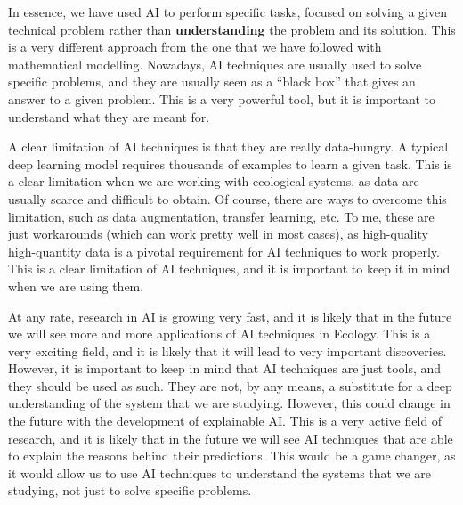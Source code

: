 In
essence, we have used AI to perform specific tasks, focused on solving a given
technical problem rather than \textbf{understanding} the problem and its
solution. This is a very different approach from the one that we have followed
with mathematical modelling. Nowadays, AI techniques are usually used to solve
specific problems, and they are usually seen as a ``black box'' that gives an
answer to a given problem. This is a very powerful tool, but it is important to
understand what they are meant for.

A clear limitation of AI techniques is that they are really data-hungry. A
typical deep learning model requires thousands of examples to learn a given
task. This is a clear limitation when we are working with ecological systems,
as data are usually scarce and difficult to obtain. Of course, there are ways
to overcome this limitation, such as data augmentation, transfer learning,
etc. To me, these are just workarounds (which can work pretty well in most
cases), as high-quality high-quantity data is a pivotal requirement for AI
techniques to work properly. This is a clear limitation of AI techniques, and
it is important to keep it in mind when we are using them.

At any rate, research in AI is growing very fast, and it is likely that in the
future we will see more and more applications of AI techniques in Ecology. This
is a very exciting field, and it is likely that it will lead to very important
discoveries. However, it is important to keep in mind that AI techniques are
just tools, and they should be used as such. They are not, by any means, a
substitute for a deep understanding of the system that we are studying.
However, this could change in the future with the development of explainable
AI. This is a very active field of research, and it is likely that in the
future we will see AI techniques that are able to explain the reasons behind
their predictions. This would be a game changer, as it would allow us to use AI
techniques to understand the systems that we are studying, not just to solve
specific problems.

